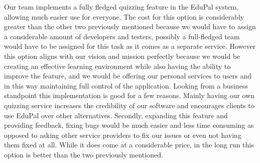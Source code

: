 \documentclass[
    english, %
]{VUMIFPSkursinis}
\begin{document}
Our team implements a fully fledged quizzing feature in the EduPal system, allowing much easier use for everyone. The cost for this option is considerably greater than the other two previously mentioned because we would have to assign a considerable amount of developers and testers, possibly a full-fledged team would have to be assigned for this task as it comes as a separate service. However this option aligns with our vision and mission perfectly because we would be creating an effective learning environment while also having the ability to improve the feature, and we would be offering our personal services to users and in this way maintaining full control of the application. Looking from a business standpoint this implementation is good for a few reasons. Mainly having our own quizzing service increases the credibility of our software and encourages clients to use EduPal over other alternatives. Secondly, expanding this feature and providing feedback, fixing bugs would be much easier and less time consuming as opposed to asking other service providers to fix our issues or even not having them fixed at all. While it does come at a considerable price, in the long run this option is better than the two previously mentioned.

\listoffigures
\printbibliography[heading=bibintoc]
\end{document}
